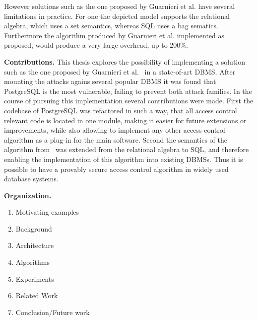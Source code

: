 However solutions such as the one proposed by Guarnieri et al. have several limitations in practice.
%
For one the depicted model supports the relational algebra, which uses a set semantics, whereas SQL uses a bag sematics.
%
Furthermore the algorithm produced by Guarnieri et al. implemented as proposed, would produce a very large overhead, up to 200\%.
%



\smallskip
\noindent
{\bf Contributions.}
This thesis explores the possibility of implementing a solution such as the one proposed by Guarnieri et al.~\cite{guarnieri2016strong} in a state-of-art DBMS.
%
After mounting the attacks agains several popular DBMS it was found that PostgreSQL is the most vulnerable, failing to prevent both attack families.
%
In the course of pursuing this implementation several contributions were made.
%
First the codebase of PostgreSQL was refactored in such a way, that all access control relevant code is located in one module, making it easier for future extensions or improvements, while also allowing to implement any other access control algorithm as a plug-in for the main software.
%
Second the semantics of the algorithm from~\cite{guarnieri2016strong} was extended from the relational algebra to SQL, and therefore enabling the implementation of this algorithm into existing DBMSs. Thus it is possible to have a provably secure access control algorithm in widely used database systems.

%


\smallskip
\noindent
{\bf Organization.}
\begin{enumerate}
	\item Motivating examples
	\item Background
	\item Architecture
	\item Algorithms
	\item Experiments
	\item Related Work
	\item Conclusion/Future work
\end{enumerate}
